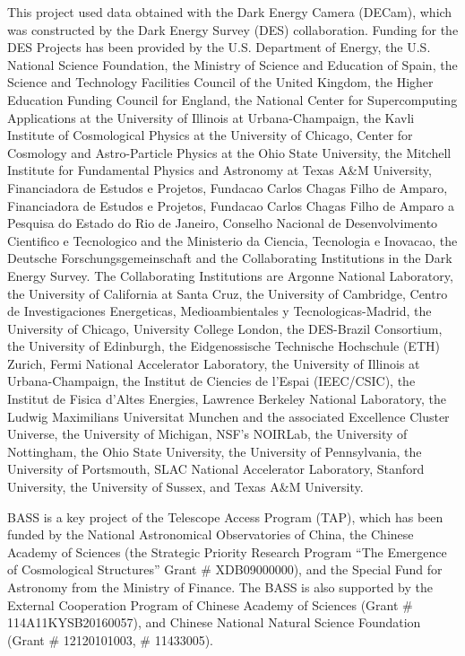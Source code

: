 \documentclass[twocolumn]{aastex631}
\begin{document}
This project used data obtained with the Dark Energy Camera (DECam), which was constructed by the Dark Energy Survey (DES) collaboration. Funding for the DES Projects has been provided by the U.S. Department of Energy, the U.S. National Science Foundation, the Ministry of Science and Education of Spain, the Science and Technology Facilities Council of the United Kingdom, the Higher Education Funding Council for England, the National Center for Supercomputing Applications at the University of Illinois at Urbana-Champaign, the Kavli Institute of Cosmological Physics at the University of Chicago, Center for Cosmology and Astro-Particle Physics at the Ohio State University, the Mitchell Institute for Fundamental Physics and Astronomy at Texas A\&M University, Financiadora de Estudos e Projetos, Fundacao Carlos Chagas Filho de Amparo, Financiadora de Estudos e Projetos, Fundacao Carlos Chagas Filho de Amparo a Pesquisa do Estado do Rio de Janeiro, Conselho Nacional de Desenvolvimento Cientifico e Tecnologico and the Ministerio da Ciencia, Tecnologia e Inovacao, the Deutsche Forschungsgemeinschaft and the Collaborating Institutions in the Dark Energy Survey. The Collaborating Institutions are Argonne National Laboratory, the University of California at Santa Cruz, the University of Cambridge, Centro de Investigaciones Energeticas, Medioambientales y Tecnologicas-Madrid, the University of Chicago, University College London, the DES-Brazil Consortium, the University of Edinburgh, the Eidgenossische Technische Hochschule (ETH) Zurich, Fermi National Accelerator Laboratory, the University of Illinois at Urbana-Champaign, the Institut de Ciencies de l’Espai (IEEC/CSIC), the Institut de Fisica d’Altes Energies, Lawrence Berkeley National Laboratory, the Ludwig Maximilians Universitat Munchen and the associated Excellence Cluster Universe, the University of Michigan, NSF’s NOIRLab, the University of Nottingham, the Ohio State University, the University of Pennsylvania, the University of Portsmouth, SLAC National Accelerator Laboratory, Stanford University, the University of Sussex, and Texas A\&M University.

BASS is a key project of the Telescope Access Program (TAP), which has been funded by the National Astronomical Observatories of China, the Chinese Academy of Sciences (the Strategic Priority Research Program “The Emergence of Cosmological Structures” Grant \# XDB09000000), and the Special Fund for Astronomy from the Ministry of Finance. The BASS is also supported by the External Cooperation Program of Chinese Academy of Sciences (Grant \# 114A11KYSB20160057), and Chinese National Natural Science Foundation (Grant \# 12120101003, \# 11433005).
\end{document}
